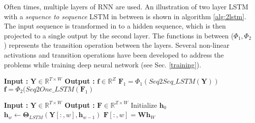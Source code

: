 \noindent Often times, multiple layers of RNN are used. An illustration of  two layer LSTM with a \textit{sequence to sequence} LSTM in between is shown in algorithm \ref{alg:2lstm}. The input sequence is transformed in to a hidden sequence, which is then projected to a single output by the second layer. The functions in between ($\Phi_{1}, \Phi_{2}$) represents the transition operation between the layers. Several non-linear activations and transition operations have been developed to address the problems while training deep neural network (see Sec. \ref{training}). 
  
\begin{minipage}[t]{7.5cm}
  \vspace{0pt}  
\begin{algorithm}[H]
  \caption{$\textbf{f}$ = $LSTM2(\textbf{Y})$}\label{alg:2lstm}
  \begin{algorithmic}[1]
    \Statex \textbf{Input :} $\textbf{Y} \in \mathbb{R}^{T \times W}$
    \Statex \textbf{Output :} $\textbf{f} \in \mathbb{R}^{Z}$
    \Statex
    \Statex
    \Statex
    \State $\textbf{F}_{1} = \Phi_{1}(Seq2Seq\_LSTM(\textbf{Y}))$
    \State $\textbf{f} = \Phi_{2}(Seq2One\_LSTM(\textbf{F}_{1})$
  \end{algorithmic}
\end{algorithm}
\end{minipage}%
\begin{minipage}[t]{7.5cm}
  \vspace{0pt}
\begin{algorithm}[H]
  \caption{$\textbf{F}$ = $Seq2Seq\_LSTM$($\textbf{Y}$) }\label{alg:s2slstm}
  \begin{algorithmic}[1]
    \Statex \textbf{Input :} $\textbf{Y} \in \mathbb{R}^{T \times W}$
    \Statex \textbf{Output :} $\textbf{F} \in \mathbb{R}^{Z \times W}$
    \State Initialize $\textbf{h}_{0}$
    \State  $\textbf{h}_{w} \leftarrow \bm{\Theta}_{LSTM}(\textbf{Y}[:,w],\textbf{h}_{w-1})$
    \State $\textbf{F}[:,w] = \textbf{W}\textbf{h}_{W}$
    \EndFor
  \end{algorithmic}
\end{algorithm}
\end{minipage}
\FloatBarrier

